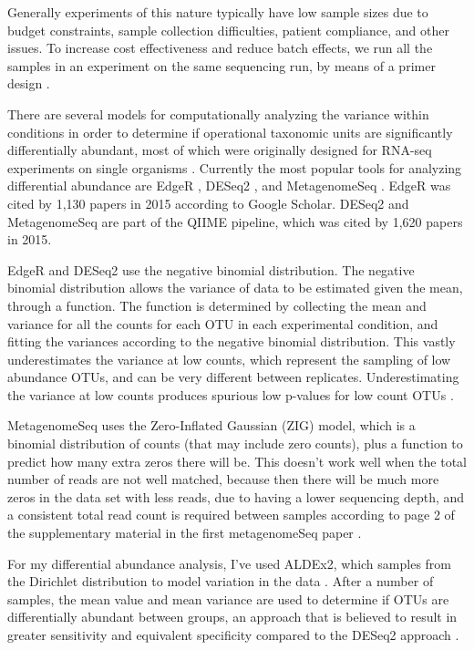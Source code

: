 Generally experiments of this nature typically have low sample sizes due to budget constraints, sample collection difficulties, patient compliance, and other issues. To increase cost effectiveness and reduce batch effects, we run all the samples in an experiment on the same sequencing run, by means of a primer design \cite{gloor2010microbiome}.

There are several models for computationally analyzing the variance within conditions in order to determine if operational taxonomic units are significantly differentially abundant, most of which were originally designed for RNA-seq experiments on single organisms \cite{pachter2011models}. Currently the most popular tools for analyzing differential abundance are EdgeR \cite{robinson2010edger}, DESeq2 \cite{love2014moderated}, and MetagenomeSeq \cite{paulson2014metagenomeseq}. EdgeR was cited by 1,130 papers in 2015 according to Google Scholar. DESeq2 and MetagenomeSeq are part of the QIIME pipeline, which was cited by 1,620 papers in 2015.

EdgeR and DESeq2 use the negative binomial distribution. The negative binomial distribution allows the variance of data to be estimated given the mean, through a function. The function is determined by collecting the mean and variance for all the counts for each OTU in each experimental condition, and fitting the variances according to the negative binomial distribution. This vastly underestimates the variance at low counts, which represent the sampling of low abundance OTUs, and can be very different between replicates. Underestimating the variance at low counts produces spurious low p-values for low count OTUs \cite{fernandes2013anova}.

MetagenomeSeq uses the Zero-Inflated Gaussian (ZIG) model, which is a binomial distribution of counts (that may include zero counts), plus a function to predict how many extra zeros there will be. This doesn’t work well when the total number of reads are not well matched, because then there will be much more zeros in the data set with less reads, due to having a lower sequencing depth, and a consistent total read count is required between samples according to page 2 of the supplementary material in the first metagenomeSeq paper \cite{paulson2014metagenomeseq}.

For my differential abundance analysis, I’ve used ALDEx2, which samples from the Dirichlet distribution to model variation in the data \cite{fernandes2014unifying}. After a number of samples, the mean value and mean variance are used to determine if OTUs are differentially abundant between groups, an approach that is believed to result in greater sensitivity and equivalent specificity compared to the DESeq2 approach \cite{fernandes2014unifying}.

